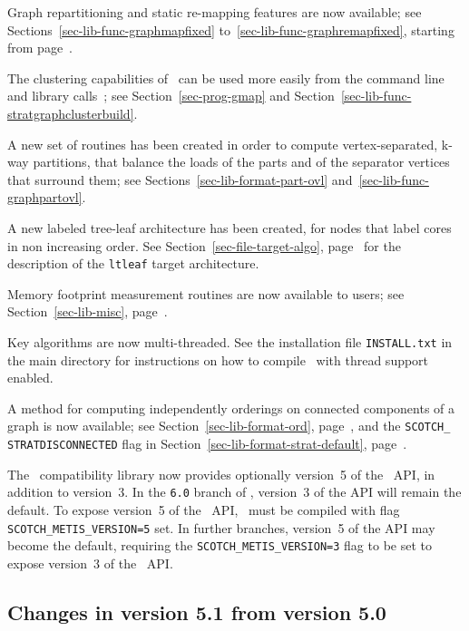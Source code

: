 Graph repartitioning and static re-mapping features are now available;
see Sections~\ref{sec-lib-func-graphmapfixed}
to~\ref{sec-lib-func-graphremapfixed}, starting from
page~\pageref{sec-lib-func-graphmapfixed}.

The clustering capabilities of \scotch\ can be used more easily from
the command line and library calls~; see Section~\ref{sec-prog-gmap}
and Section~\ref{sec-lib-func-stratgraphclusterbuild}.

A new set of routines has been created in order to compute
vertex-separated, k-way partitions, that balance the loads of the
parts and of the separator vertices that surround them; see
Sections~\ref{sec-lib-format-part-ovl}
and~\ref{sec-lib-func-graphpartovl}.

A new labeled tree-leaf architecture has been created, for nodes that
label cores in non increasing order. See
Section~\ref{sec-file-target-algo},
page~\pageref{sec-file-target-algo} for the description of the
\texttt{ltleaf} target architecture.

Memory footprint measurement routines are now available to users;
see Section~\ref{sec-lib-misc}, page~\pageref{sec-lib-misc}.

Key algorithms are now multi-threaded. See the installation file
\texttt{INSTALL.txt} in the main directory for instructions on how to
compile \scotch\ with thread support enabled.

A method for computing independently orderings on connected components
of a graph is now available; see Section~\ref{sec-lib-format-ord},
page~\pageref{sec-lib-format-ord}, and the \texttt{SCOTCH\_\lbt
STRAT\lbt DISCON\lbt NECTED} flag in
Section~\ref{sec-lib-format-strat-default},
page~\pageref{sec-lib-format-strat-default}.

The \metis\ compatibility library now provides optionally version~5 of
the \metis\ API, in addition to version~3. In the \texttt{6.0} branch
of \scotch, version~3 of the API will remain the default. To expose
version~5 of the \metis\ API, \scotch\ must be compiled with flag
\texttt{SCOTCH\_\lbt METIS\_\lbt VERSION=5} set. In further branches,
version~5 of the API may become the default, requiring the
\texttt{SCOTCH\_\lbt METIS\_\lbt VERSION=3} flag to be set to expose
version~3 of the \metis\ API.

\subsection{Changes in version 5.1 from version 5.0}


